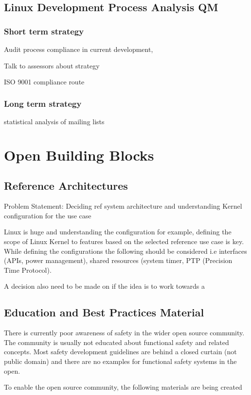 \documentclass[12pt]{../Common_files/ElisaPaper}
\begin{document}
\subsection{Linux Development Process Analysis QM}

\subsubsection{Short term strategy}
Audit process compliance in current development, 

Talk to assessors about strategy

ISO 9001 compliance route

\subsubsection{Long term strategy}
statistical analysis of mailing lists




\section{Open Building Blocks}

\subsection{Reference Architectures}
Problem Statement: Deciding ref system architecture and understanding Kernel configuration for the use case

Linux is huge and understanding the configuration for example, defining the scope of Linux Kernel to features based on the selected reference use case is key. 
While defining the configurations the following should be considered i.e interfaces (APIs, power management), shared resources (system timer, PTP (Precision Time Protocol). 

A decision also need to be made on if the idea is to work towards a  
\subsection{Education and Best Practices Material}
There is currently poor awareness of safety in the wider open source community. 
The  community is usually not educated about functional safety and related concepts. 
Most safety development guidelines are behind a closed curtain (not public domain) and there are no examples for functional safety systems in the open.

To enable the open source community, the following materials are being created
\end{document}
